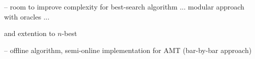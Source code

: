 \documentclass[runningheads]{llncs}
\begin{document}
\noindent
-- room to improve complexity for best-search algorithm
... modular approach with oracles ...

and extention to $n$-best

\noindent
-- offline algorithm, 
semi-online implementation for AMT (bar-by-bar approach)




%
% 

%





\newpage
\appendix 
\end{document}
